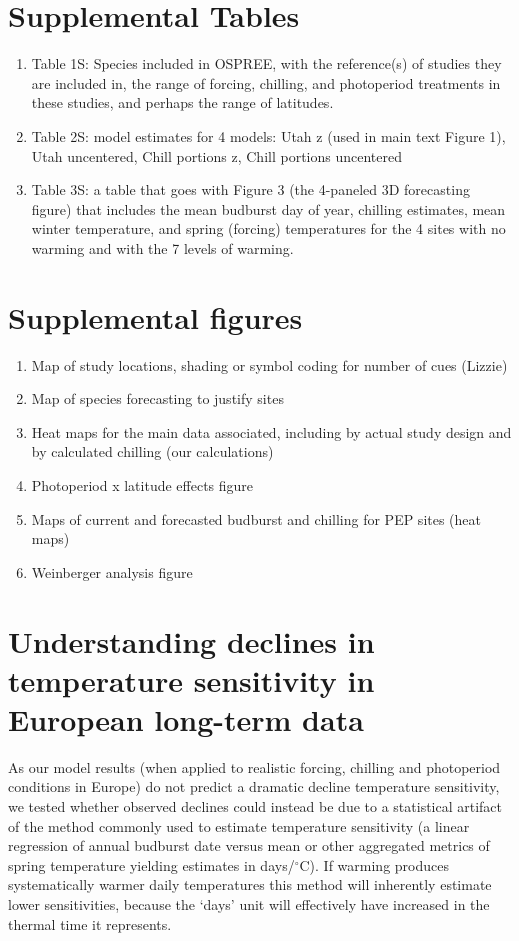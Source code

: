 \documentclass{article}
\begin{document}
\section*{Supplemental Tables}
\begin{enumerate}
\item Table 1S: Species included in OSPREE, with the reference(s) of studies they are included in, the range of forcing, chilling, and photoperiod treatments in these studies, and perhaps the range of latitudes.
\item Table 2S: model estimates for 4 models: Utah z (used in main text Figure 1), Utah uncentered, Chill portions z, Chill portions uncentered
\item Table 3S: a table that goes with Figure 3 (the 4-paneled 3D forecasting figure) that includes the mean budburst day of year, chilling estimates, mean winter temperature, and spring (forcing) temperatures for the 4 sites with no warming and with the 7 levels of warming.
\end{enumerate}
\section*{Supplemental figures}
\begin{enumerate}
\item Map of study locations, shading or symbol coding for number of cues (Lizzie)
\item Map of species forecasting to justify sites
\item Heat maps for the main data associated, including by actual study design and by calculated chilling (our calculations)
\item Photoperiod x latitude effects figure
\item Maps of current and forecasted budburst and chilling for PEP sites (heat maps)
\item Weinberger analysis figure


\end{enumerate}


\section*{Understanding declines in temperature sensitivity in European long-term data}
As our model results (when applied to realistic forcing, chilling and photoperiod conditions in Europe) do not predict a dramatic decline temperature sensitivity, we tested whether observed declines could instead be due to a statistical artifact of the method commonly used to estimate temperature sensitivity (a linear regression of annual budburst date versus mean or other aggregated metrics of spring temperature yielding estimates in days/$^{\circ}$C). If warming produces systematically warmer daily temperatures this method will inherently estimate lower sensitivities, because the `days' unit will effectively have increased in the thermal time it represents.
\end{document}
